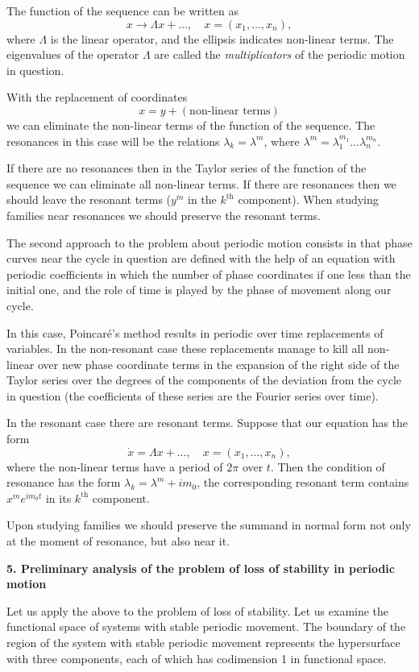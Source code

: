 \documentclass[12pt]{amsart}
\begin{document}
The function of the sequence can be written as
$$x\to\Lambda x+\dots,\quad x=(x_1,\dots,x_n),$$
where $\Lambda$ is the linear operator, and the ellipsis indicates non-linear
terms.
The eigenvalues of the operator $\Lambda$ are called the \textit{multiplicators}
of the periodic motion in question.

With the replacement of coordinates
$$x=y+(\text{non-linear terms})$$
we can eliminate the non-linear terms of the function of the sequence.
The resonances in this case will be the relations $\lambda_k=\lambda^m$, where
$\lambda^m=\lambda_1^{m_1}\dots\lambda_n^{m_n}$.

If there are no resonances then in the Taylor series of the function of the
sequence we can eliminate all non-linear terms.
If there are resonances then we should leave the resonant terms ($y^m$ in the
$k^\text{th}$ component).
When studying families near resonances we should preserve the resonant terms.

The second approach to the problem about periodic motion consists in that phase
curves near the cycle in question are defined with the help of an equation with
periodic coefficients in which the number of phase coordinates if one less than
the initial one, and the role of time is played by the phase of movement along
our cycle.

In this case, Poincar\'e's method results in periodic over time replacements of
variables.
In the non-resonant case these replacements manage to kill all non-linear over
new phase coordinate terms in the expansion of the right side of the Taylor
series over the degrees of the components of the deviation from the cycle in
question (the coefficients of these series are the Fourier series over time).

In the resonant case there are resonant terms.
Suppose that our equation has the form
$$\dot x=\Lambda x+\dots,\quad x=(x_1,\dots,x_n),$$
where the non-linear terms have a period of $2\pi$ over $t$.
Then the condition of resonance has the form $\lambda_k=\lambda^m+im_0$,
the corresponding resonant term contains $x^me^{im_0t}$ in its $k^\text{th}$
component.

Upon studying families we should preserve the summand in normal form not only at
the moment of resonance, but also near it.\\

\centerline{\textbf{5. Preliminary analysis of the problem of loss of stability
in periodic motion}}
\vspace{1em}
Let us apply the above to the problem of loss of stability.
Let us examine the functional space of systems with stable periodic movement.
The boundary of the region of the system with stable periodic movement
represents the hypersurface with three components, each of which has codimension
1 in functional space.
\end{document}
